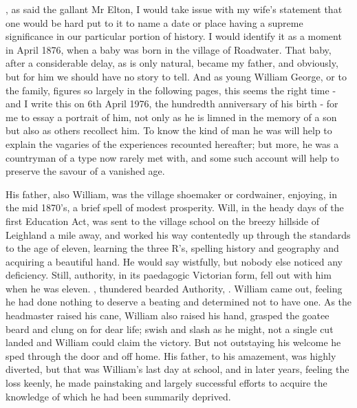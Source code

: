 
, as said the gallant Mr Elton, I would take issue with my wife’s statement that one would be hard put to it to name a date or place having a supreme significance in our particular portion of history. I would identify it as a moment in April 1876, when a baby was born in the village of Roadwater. That baby, after a considerable delay, as is only natural, became my father, and obviously, but for him we should have no story to tell. And as young William George, or  to the family, figures so largely in the following pages, this seems the right time - and I write this on 6th April 1976, the hundredth anniversary of his birth - for me to essay a portrait of him, not only as he is limned in the memory of a son but also as others recollect him. To know the kind of man he was will help to explain the vagaries of the experiences recounted hereafter; but more, he was a countryman of a type now rarely met with, and some such account will help to preserve the savour of a vanished age.

His father, also William, was the village shoemaker or cordwainer, enjoying, in the mid 1870’s, a brief spell of modest prosperity. Will, in the heady days of the first Education Act, was sent to the village school on the breezy hillside of Leighland a mile away, and worked his way contentedly up through the standards to the age of eleven, learning the three R’s, spelling history and geography and acquiring a beautiful hand. He would say wistfully,  but nobody else noticed any deficiency. Still, authority, in its paedagogic Victorian form, fell out with him when he was eleven. , thundered bearded Authority, . William came out, feeling he had done nothing to deserve a beating and determined not to have one. As the headmaster raised his cane, William also raised his hand, grasped the goatee beard and clung on for dear life; swish and slash as he might, not a single cut landed and William could claim the victory. But not outstaying his welcome he sped through the door and off home. His father, to his amazement, was highly diverted, but that was William's last day at school, and in later years, feeling the loss keenly, he made painstaking and largely successful efforts to acquire the knowledge of which he had been summarily deprived.

